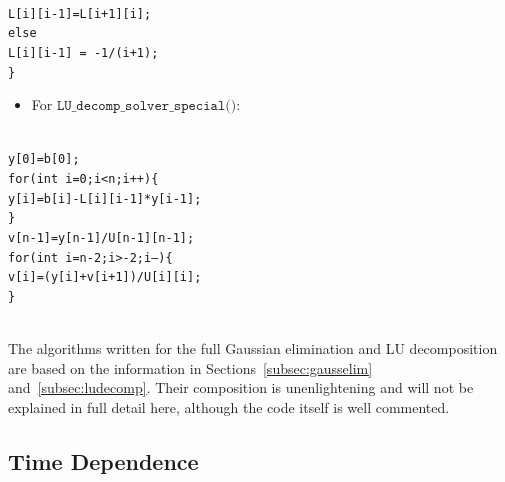 \documentclass[12pt]{article}
\numberwithin{equation}{section}
\begin{document}
\\\indent\indent\indent\indent \texttt{L[i][i-1]=L[i+1][i];}
\\\indent\indent\indent \texttt{else} 
\\\indent\indent\indent\indent \texttt{L[i][i-1] = -1/(i+1);}
\\\indent\indent\texttt{\}}
\begin{itemize}
\item For $\texttt{LU\_decomp\_solver\_special()}$:
\end{itemize}
\\\indent\indent\indent\texttt{y[0]=b[0];}
\\\indent\indent\texttt{for(int i=0;i<n;i++)\{}
\\\indent\indent\indent\texttt{y[i]=b[i]-L[i][i-1]*y[i-1];}
\\\indent\indent\texttt{\}}
\\\indent\indent\texttt{v[n-1]=y[n-1]/U[n-1][n-1];}
\\\indent\indent\texttt{for(int i=n-2;i>-2;i--)\{}
\\\indent\indent\indent\texttt{v[i]=(y[i]+v[i+1])/U[i][i];}
\\\indent\indent\texttt{\}}
\vspace{.4cm}

\\\indent The algorithms written for the full Gaussian elimination and LU decomposition are based on the information in Sections~\ref{subsec:gausselim} and~\ref{subsec:ludecomp}.  Their composition is unenlightening and will not be explained in full detail here, although the code itself is well commented.

\subsection{Time Dependence}
\label{subsec:timedependence}
\end{document}
